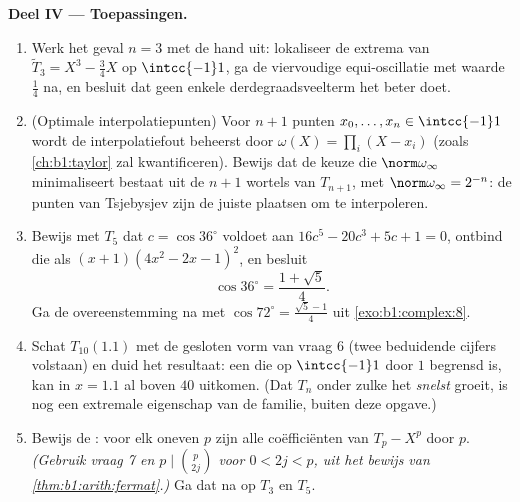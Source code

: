 \begin{problem}
\medskip
\noindent\textbf{Deel IV --- Toepassingen.}
\begin{enumerate}[resume]
  \item Werk het geval $n = 3$ met de hand uit: lokaliseer de extrema
        van $\widetilde T_3 = X^3 - \frac34X$ op $\intcc{-1}1$, ga de
        viervoudige equi-oscillatie met waarde $\frac14$ na, en besluit
        dat geen enkele  derdegraadsveelterm het beter doet.
  \item (Optimale interpolatiepunten) Voor $n + 1$ punten $x_0, \dots,
        x_n \in \intcc{-1}1$ wordt de interpolatiefout beheerst door
        $\omega(X) = \prod_i (X - x_i)$ (zoals \cref{ch:b1:taylor} zal
        kwantificeren). Bewijs dat de keuze die $\norm\omega_\infty$
        minimaliseert bestaat uit de $n + 1$ wortels van $T_{n+1}$, met
        $\norm\omega_\infty = 2^{-n}$: de punten van Tsjebysjev zijn de
        juiste plaatsen om te interpoleren.
  \item Bewijs met $T_5$ dat $c = \cos 36^\circ$ voldoet aan $16c^5 -
        20c^3 + 5c + 1 = 0$, ontbind die  als $(x + 1)(4x^2 - 2x
        - 1)^2$, en besluit
        \[
        \cos 36^\circ = \frac{1 + \sqrt5}4 .
        \]
        Ga de overeenstemming na met $\cos 72^\circ = \frac{\sqrt5 -
        1}4$ uit \cref{exo:b1:complex:8}.
  \item Schat $T_{10}(1.1)$ met de gesloten vorm van vraag 6 (twee
        beduidende cijfers volstaan) en duid het resultaat: een 
        die op $\intcc{-1}1$ door $1$ begrensd is, kan in $x = 1.1$ al
        boven $40$ uitkomen. (Dat $T_n$ onder zulke  het
        \emph{snelst} groeit, is nog een extremale eigenschap van de
        familie, buiten deze opgave.)
  \item Bewijs de : voor elk oneven  $p$ zijn alle
        coëfficiënten van $T_p - X^p$  door $p$. \emph{(Gebruik
        vraag 7 en $p \mid \binom p{2j}$ voor $0 < 2j < p$, uit het
        bewijs van \cref{thm:b1:arith:fermat}.)} Ga dat na op $T_3$ en
        $T_5$.
\end{enumerate}


\end{problem}
